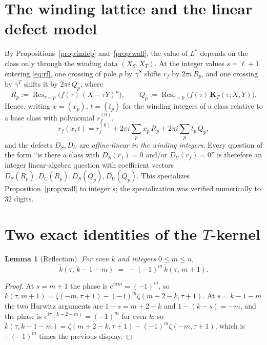 \documentclass[11pt]{article}
\newtheorem{lemma}{Lemma}
\theoremstyle{definition}
\theoremstyle{remark}
\newcommand{\Res}{\operatorname{Res}}
\newcommand{\tk}{\widetilde{k}}
\newcommand{\KT}{\mathbf{K}_T}
\begin{document}
\section{The winding lattice and the linear defect model}\label{sec:lattice}

By Propositions~\ref{prop:indep} and~\ref{prop:wall}, the value of $L^*$ depends on the
class only through the winding data $(X_S,X_T)$.  At the
integer values $s=\ell+1$ entering \eqref{eq:rf}, one crossing of pole $p$ by $\gamma^S$
shifts $r_f$ by $2\pi i\,R_p$, and one crossing by $\gamma^T$ shifts it by $2\pi i\,Q_p$,
where
\begin{equation}\label{eq:gens}
R_p:=\Res_{\tau=p}\!\big(f(\tau)\,(X-\tau Y)^n\big),
\qquad
Q_p:=\Res_{\tau=p}\!\big(f(\tau)\,\KT(\tau;X,Y)\big).
\end{equation}
Hence, writing $x=(x_p)$, $t=(t_p)$ for the winding integers of a class relative to a base
class with polynomial $r_f^{(0)}$,
\begin{equation}\label{eq:linear}
r_f(x,t) = r_f^{(0)} + 2\pi i\sum_p x_p\,R_p + 2\pi i\sum_p t_p\,Q_p ,
\end{equation}
and the defects $D_S,D_U$ are \emph{affine-linear in the winding integers}.  Every
question of the form ``is there a class with $D_S(r_f)=0$ and/or $D_U(r_f)=0$'' is
therefore an integer linear-algebra question with coefficient vectors
$D_S(R_p),D_U(R_p),D_S(Q_p),D_U(Q_p)$.  This specializes Proposition~\ref{prop:wall} to
integer $s$; the specialization was verified numerically to $32$ digits.

\section{Two exact identities of the $T$-kernel}\label{sec:identities}

\begin{lemma}[Reflection]\label{lem:reflect}
For even $k$ and integers $0\le m\le n$,
\[
\tk(\tau,\,k-1-m) \;=\; -(-1)^m\,\tk(\tau,\,m+1).
\]
\end{lemma}

\begin{proof}
At $s=m+1$ the phase is $e^{i\pi m}=(-1)^m$, so
$\tk(\tau,m+1)=\zeta(-m,\tau+1)-(-1)^m\zeta(m+2-k,\tau+1)$.
At $s=k-1-m$ the two Hurwitz arguments are $1-s=m+2-k$ and $1-(k-s)=-m$, and the phase is
$e^{i\pi(k-2-m)}=(-1)^m$ for even $k$; so
$\tk(\tau,k-1-m)=\zeta(m+2-k,\tau+1)-(-1)^m\zeta(-m,\tau+1)$,
which is $-(-1)^m$ times the previous display.
\end{proof}
\end{document}
